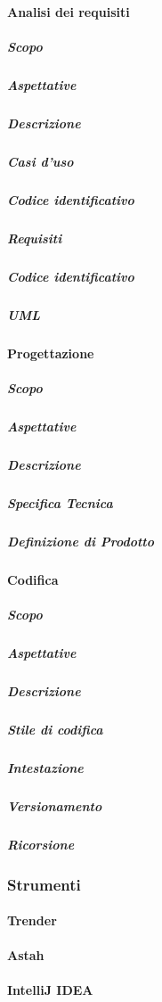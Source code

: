 		\paragraph{Analisi dei requisiti}
			\subparagraph{Scopo}
			\subparagraph{Aspettative}
			\subparagraph{Descrizione}
			\subparagraph{Casi d'uso}
			\subparagraph{Codice identificativo}
			\subparagraph{Requisiti}
			\subparagraph{Codice identificativo}
			\subparagraph{UML}
		\paragraph{Progettazione}
			\subparagraph{Scopo}
			\subparagraph{Aspettative}
			\subparagraph{Descrizione}
			\subparagraph{Specifica Tecnica}
			\subparagraph{Definizione di Prodotto}
		\paragraph{Codifica}
			\subparagraph{Scopo}
			\subparagraph{Aspettative}
			\subparagraph{Descrizione}
			\subparagraph{Stile di codifica}
			\subparagraph{Intestazione}
			\subparagraph{Versionamento}
			\subparagraph{Ricorsione}
	\subsubsection{Strumenti}
		\paragraph{Trender}
		\paragraph{Astah}
		\paragraph{IntelliJ IDEA}
			
			